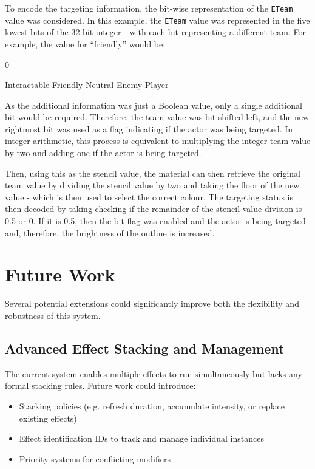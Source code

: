 \documentclass{article}
\begin{document}
To encode the targeting information, the bit-wise representation of the \texttt{ETeam} value was considered. In this example, the \texttt{ETeam} value was represented in the five lowest bits of the 32-bit integer - with each bit representing a different team. For example, the value for “friendly” would be:

0    

Interactable \quad Friendly \quad Neutral \quad Enemy \quad Player

As the additional information was just a Boolean value, only a single additional bit would be required. Therefore, the team value was bit-shifted left, and the new rightmost bit was used as a flag indicating if the actor was being targeted. In integer arithmetic, this process is equivalent to multiplying the integer team value by two and adding one if the actor is being targeted.

Then, using this as the stencil value, the material can then retrieve the original team value by dividing the stencil value by two and taking the floor of the new value - which is then used to select the correct colour. The targeting status is then decoded by taking checking if the remainder of the stencil value division is 0.5 or 0. If it is 0.5, then the bit flag was enabled and the actor is being targeted and, therefore, the brightness of the outline is increased.

\section{Future Work}

Several potential extensions could significantly improve both the flexibility and robustness of this system.

\subsection{Advanced Effect Stacking and Management}

The current system enables multiple effects to run simultaneously but lacks any formal stacking rules. Future work could introduce:
\begin{itemize}
    \item Stacking policies (e.g. refresh duration, accumulate intensity, or replace existing effects) 
    \item Effect identification IDs to track and manage individual instances 
    \item Priority systems for conflicting modifiers 
\end{itemize}
\end{document}
